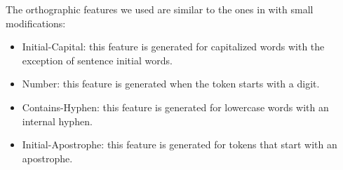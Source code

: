 

The orthographic features we used are similar to the ones in
\cite{bergkirkpatrick-EtAl:2010:NAACLHLT} with small modifications:

\begin{itemize}
\item Initial-Capital: this feature is generated for capitalized words
  with the exception of sentence initial words.
\item Number: this feature is generated when the token starts with a
  digit.
\item Contains-Hyphen: this feature is generated for lowercase words
  with an internal hyphen.
\item Initial-Apostrophe: this feature is generated for tokens that
  start with an apostrophe.
\end{itemize}

